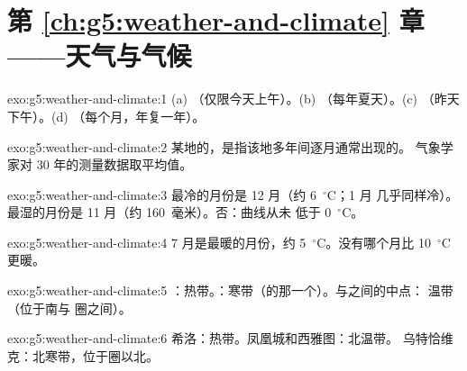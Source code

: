 \section*{第 \ref{ch:g5:weather-and-climate} 章——天气与气候}

\begin{solution}{exo:g5:weather-and-climate:1}
(a) （仅限今天上午）。(b) （每年夏天）。(c) 
（昨天下午）。(d) （每个月，年复一年）。
\end{solution}

\begin{solution}{exo:g5:weather-and-climate:2}
某地的，是指该地多年间逐月通常出现的。
气象学家对 30 年的测量数据取平均值。
\end{solution}

\begin{solution}{exo:g5:weather-and-climate:3}
最冷的月份是 12 月（约 6~$^\circ$C；1 月
几乎同样冷）。最湿的月份是 11 月（约 160~毫米）。否：曲线从未
低于 0~$^\circ$C。
\end{solution}

\begin{solution}{exo:g5:weather-and-climate:4}
7 月是最暖的月份，约 5~$^\circ$C。没有哪个月比
10~$^\circ$C 更暖。
\end{solution}

\begin{solution}{exo:g5:weather-and-climate:5}
：热带。：寒带（的那一个）。与之间的中点：
温带（位于南与
圈之间）。
\end{solution}

\begin{solution}{exo:g5:weather-and-climate:6}
希洛：热带。凤凰城和西雅图：北温带。
乌特恰维克：北寒带，位于圈以北。
\end{solution}

